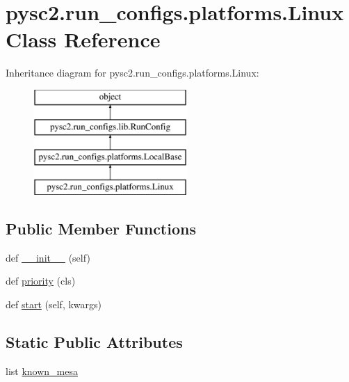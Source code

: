 \hypertarget{classpysc2_1_1run__configs_1_1platforms_1_1_linux}{}\section{pysc2.\+run\+\_\+configs.\+platforms.\+Linux Class Reference}
\label{classpysc2_1_1run__configs_1_1platforms_1_1_linux}
Inheritance diagram for pysc2.\+run\+\_\+configs.\+platforms.\+Linux\+:\begin{figure}[H]
\begin{center}
\leavevmode
\includegraphics[height=4.000000cm]{classpysc2_1_1run__configs_1_1platforms_1_1_linux}
\end{center}
\end{figure}
\subsection*{Public Member Functions}
\begin{DoxyCompactItemize}
\item 
def \mbox{\hyperlink{classpysc2_1_1run__configs_1_1platforms_1_1_linux_a06f906f71c6cdd07a5249871b24c0aea}{\+\_\+\+\_\+init\+\_\+\+\_\+}} (self)
\item 
def \mbox{\hyperlink{classpysc2_1_1run__configs_1_1platforms_1_1_linux_a2f1c9498e2a28175792e421daa11c5ac}{priority}} (cls)
\item 
def \mbox{\hyperlink{classpysc2_1_1run__configs_1_1platforms_1_1_linux_a266b7d15eb79da465b9d6968398936ea}{start}} (self, kwargs)
\end{DoxyCompactItemize}
\subsection*{Static Public Attributes}
\begin{DoxyCompactItemize}
\item 
list \mbox{\hyperlink{classpysc2_1_1run__configs_1_1platforms_1_1_linux_af3779a9cffe30d5d7f87ffce73a61772}{known\+\_\+mesa}}
\end{DoxyCompactItemize}
